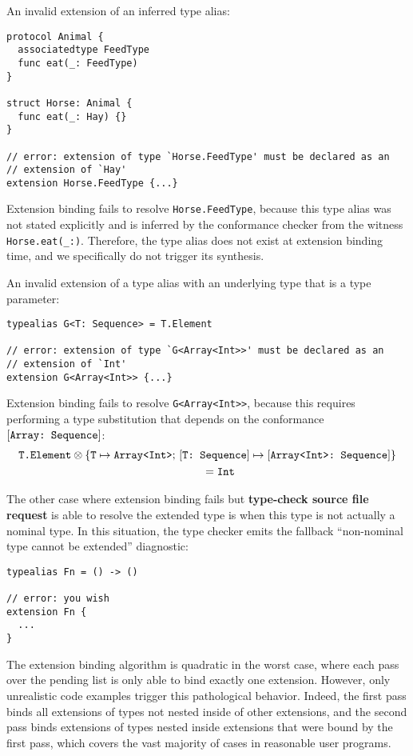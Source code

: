 \documentclass[../generics]{subfiles}
\begin{document}
\begin{example}\label{bad extension 1} An invalid extension of an inferred type alias:
\begin{Verbatim}
protocol Animal {
  associatedtype FeedType
  func eat(_: FeedType)
}

struct Horse: Animal {
  func eat(_: Hay) {}
}

// error: extension of type `Horse.FeedType' must be declared as an
// extension of `Hay'
extension Horse.FeedType {...}
\end{Verbatim}
Extension binding fails to resolve \texttt{Horse.FeedType}, because this type alias was not stated explicitly and is inferred by the conformance checker from the witness \verb|Horse.eat(_:)|. Therefore, the type alias does not exist at extension binding time, and we specifically do not trigger its synthesis.
\end{example}
\begin{example}\label{bad extension 2}
An invalid extension of a type alias with an underlying type that is a type parameter:
\begin{Verbatim}
typealias G<T: Sequence> = T.Element

// error: extension of type `G<Array<Int>>' must be declared as an
// extension of `Int'
extension G<Array<Int>> {...}
\end{Verbatim}
Extension binding fails to resolve \texttt{G<Array<Int>>}, because this requires performing a type substitution that depends on the conformance $[\texttt{Array:~Sequence}]$:
\begin{gather*}
\texttt{T.Element}\otimes\{\texttt{T} \mapsto \texttt{Array<Int>};\,[\texttt{T:~Sequence}] \mapsto [\texttt{Array<Int>:~Sequence}]\}\\
\qquad {} =\texttt{Int}
\end{gather*}
\end{example}

The other case where extension binding fails but \textbf{type-check source file request} is able to resolve the extended type is when this type is not actually a nominal type. In this situation, the type checker emits the fallback ``non-nominal type cannot be extended'' diagnostic:
\begin{Verbatim}
typealias Fn = () -> ()

// error: you wish
extension Fn {
  ...
}
\end{Verbatim}

The extension binding algorithm is quadratic in the worst case, where each pass over the pending list is only able to bind exactly one extension. However, only unrealistic code examples trigger this pathological behavior. Indeed, the first pass binds all extensions of types not nested inside of other extensions, and the second pass binds extensions of types nested inside extensions that were bound by the first pass, which covers the vast majority of cases in reasonable user programs.
\end{document}
